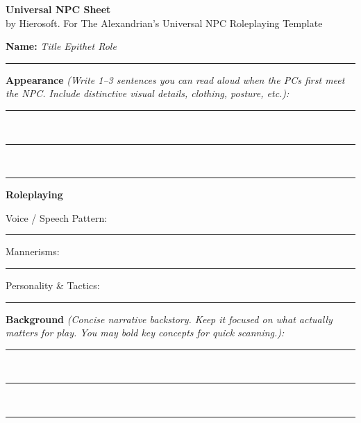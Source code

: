 \documentclass[11pt,letterpaper]{article}
\begin{document}
\begin{center}
{\textbf{Universal NPC Sheet}}\\
\small{by Hierosoft. For The Alexandrian's Universal NPC Roleplaying Template}
\end{center}
\vspace{0.0em}

\noindent\textbf{Name:} \hfill 
\textit{Title \hspace{2.2em} Epithet \hspace{2.2em} Role}

\rule{\textwidth}{0.6pt}

\vspace{1.4em}

\noindent\textbf{Appearance} \textit{(Write 1--3 sentences you can read aloud when the PCs first meet the NPC. Include distinctive visual details, clothing, posture, etc.):}

\vspace{0.0em}
\rule{\textwidth}{0.4pt} \\
\rule{\textwidth}{0.4pt} \\
\rule{\textwidth}{0.4pt}

\vspace{1.2em}

\noindent\textbf{Roleplaying}

Voice / Speech Pattern: \rule{11.8cm}{0.4pt}

Mannerisms: \rule{11.8cm}{0.4pt}

Personality \& Tactics: \rule{11.8cm}{0.4pt}

\vspace{1.2em}


\noindent\textbf{Background} \textit{(Concise narrative backstory. Keep it focused on what actually matters for play. You may bold key concepts for quick scanning.):}

\vspace{0.0em}
\rule{\textwidth}{0.4pt} \\
\rule{\textwidth}{0.4pt} \\
\rule{\textwidth}{0.4pt}

\vspace{1.2em}
\end{document}
